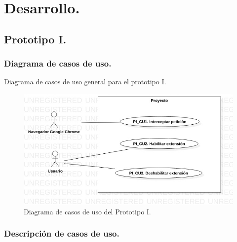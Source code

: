 \documentclass[12pt, a4paper, titlepage]{article}
\begin{document}
	
	\section{\textcolor{azulescom}{Desarrollo.}}
		\subsection{Prototipo I.}
			\subsubsection{Diagrama de casos de uso.}

				Diagrama de casos de uso general para el prototipo I.
				\begin{figure}[htb]
					\begin{center}
			    	\includegraphics[width=14cm]{./imagenes/UCD_P1.jpg}
						\caption{Diagrama de casos de uso del Prototipo I.}
					\end{center}
				\end{figure}\newpage	
					
			\subsubsection{Descripción de casos de uso.}
			
\end{document}

